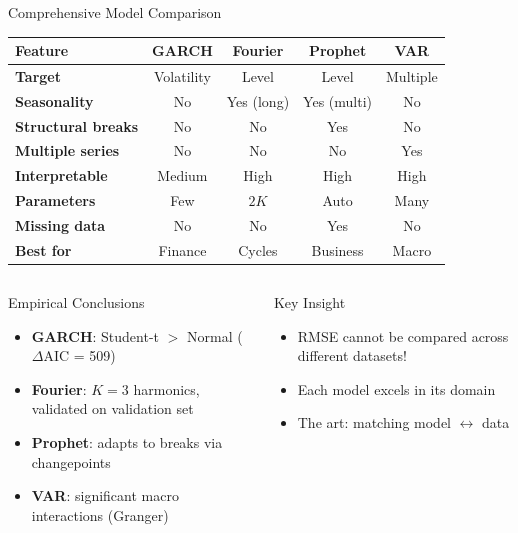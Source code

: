 \documentclass[9pt, aspectratio=169, t]{beamer}
\begin{document}
\begin{frame}{Comprehensive Model Comparison}
    \begin{center}
    \footnotesize
    \begin{tabular}{lcccc}
        \toprule
        \textbf{Feature} & \textbf{GARCH} & \textbf{Fourier} & \textbf{Prophet} & \textbf{VAR} \\
        \midrule
        \textbf{Target} & Volatility & Level & Level & Multiple \\
        \textbf{Seasonality} & No & Yes (long) & Yes (multi) & No \\
        \textbf{Structural breaks} & No & No & Yes & No \\
        \textbf{Multiple series} & No & No & No & Yes \\
        \textbf{Interpretable} & Medium & High & High & High \\
        \textbf{Parameters} & Few & $2K$ & Auto & Many \\
        \textbf{Missing data} & No & No & Yes & No \\
        \midrule
        \textbf{Best for} & Finance & Cycles & Business & Macro \\
        \bottomrule
    \end{tabular}
    \end{center}

    \vspace{0.3cm}

    \begin{columns}[T]
        \begin{block}{Empirical Conclusions}
            \begin{itemize}\setlength{\itemsep}{0pt}
                \item \textbf{GARCH}: Student-t $>$ Normal ($\Delta$AIC = 509)
                \item \textbf{Fourier}: $K=3$ harmonics, validated on validation set
                \item \textbf{Prophet}: adapts to breaks via changepoints
                \item \textbf{VAR}: significant macro interactions (Granger)
            \end{itemize}
        \end{block}

        \begin{exampleblock}{Key Insight}
            \begin{itemize}\setlength{\itemsep}{0pt}
                \item RMSE cannot be compared across different datasets!
                \item Each model excels in its domain
                \item The art: matching model $\leftrightarrow$ data
            \end{itemize}
        \end{exampleblock}
    \end{columns}
\end{frame}
\end{document}
